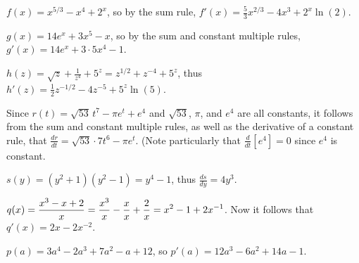 \begin{activitySolution}
\ba
	  \item $f(x) = x^{5/3} - x^4 + 2^x$, so by the sum rule, $f'(x) = \frac{5}{3}x^{2/3} - 4 x^3 + 2^x \ln(2).$
	  \item $g(x) = 14e^x + 3x^5 - x$, so by the sum and constant multiple rules, $g'(x) = 14e^x + 3 \cdot 5x^4 - 1$.
	  \item $h(z) = \sqrt{z} + \frac{1}{z^4} + 5^z = z^{1/2} + z^{-4} + 5^z$, thus $h'(z) = \frac{1}{2}z^{-1/2} - 4z^{-5} + 5^z \ln(5)$.
	  \item Since $r(t) = \sqrt{53} \, t^7 - \pi e^t + e^4$ and $\sqrt{53}$, $\pi$, and $e^4$ are all constants, it follows from the sum and constant multiple rules, as well as the derivative of a constant rule, that $\frac{dr}{dt} = \sqrt{53} \cdot 7 t^6 - \pi e^t$.  (Note particularly that $\frac{d}{dt}[e^4] = 0$ since $e^4$ is constant.
	  \item $s(y) = (y^2 + 1)(y^2 - 1)= y^4 - 1$, thus $\frac{ds}{dy} = 4y^3$.
	  \item $q(x) = \displaystyle \frac{x^3 - x + 2}{x} = \displaystyle \frac{x^3}{x} - \frac{x}{x} + \frac{2}{x} = x^2 - 1 + 2x^{-1}$.  Now it follows that $q'(x) = 2x - 2x^{-2}$.
	  \item $p(a) = 3a^4 - 2a^3 + 7a^2 - a + 12$, so $p'(a) = 12a^3 - 6 a^2 + 14a - 1.$
\ea
\end{activitySolution}
\aftera